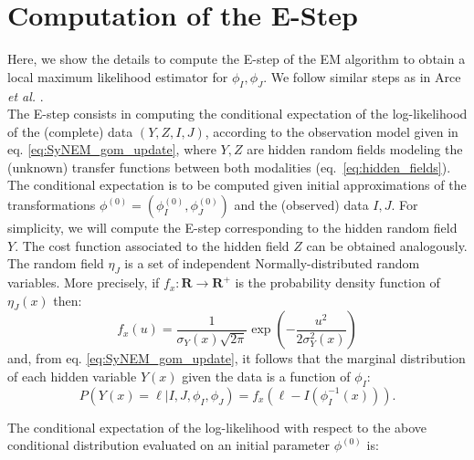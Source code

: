 \appendix
\section{Computation of the E-Step}\label{ap:E_step}
Here, we show the details to compute the E-step of the EM algorithm \cite{Dempster1977} to obtain a local maximum likelihood estimator for $\phi_{I}, \phi_{J}$. 
We follow similar steps as in Arce {\it et al.} \cite{Arce-santana2014}.\\

The E-step \cite{Dempster1977} consists in computing the conditional expectation of the log-likelihood of the (complete) data $(Y, Z, I, J)$, according to the observation model given in eq. \eqref{eq:SyNEM_gom_update}, where $Y, Z$ are hidden random fields modeling the (unknown) transfer functions between both modalities \hbox{(eq. \eqref{eq:hidden_fields})}.
The conditional expectation is to be computed given initial
approximations of the transformations $\phi^{(0)} = \left(\phi_{I}^{(0)}, \phi_{J}^{(0)}\right)$ and the (observed) data $I, J$. For simplicity, we will compute the E-step corresponding to the hidden random field $Y$.
The cost function associated to the hidden field $Z$ can be obtained analogously.\\

The random field $\eta_{J}$ is a set of independent Normally-distributed random variables. More precisely, if $f_{x}:\mathbf{R}\rightarrow \mathbf{R}^{+}$ is the probability density
function of $\eta_{J}(x)$ then:
\begin{equation}\label{eq:gaussian}
    f_{x}(u) = \frac{1}{\sigma_{Y}(x)\sqrt{2 \pi}}\exp\left(-\frac{u^{2}}{2\sigma^{2}_{Y}(x)}\right)
\end{equation}
and, from eq. \eqref{eq:SyNEM_gom_update}, it follows that the marginal distribution of each hidden variable $Y(x)$ given the data is a function of $\phi_I$:
\begin{equation}
    P(Y(x) = \ell | I, J, \phi_{I}, \phi_{J}) = f_{x}(\ell - I(\phi^{-1}_{I}(x))).
\end{equation}

The conditional expectation of the log-likelihood with respect to the above conditional distribution evaluated on an initial parameter $\phi^{(0)}$ is:

